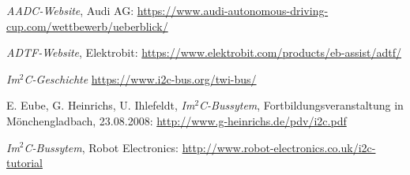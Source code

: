 \documentclass[12pt, a4paper]{scrartcl}
\begin{document}

\newpage
{}
\listoffigures

\newpage
{}
\begin{thebibliography}{9}
	\textit{AADC-Website},
	Audi AG:
	\url{https://www.audi-autonomous-driving-cup.com/wettbewerb/ueberblick/}
	
	\textit{ADTF-Website},
	Elektrobit:
	\url{https://www.elektrobit.com/products/eb-assist/adtf/}
	
	\textit{Im$^2$C-Geschichte}
	\url{https://www.i2c-bus.org/twi-bus/}
	
	E. Eube, G. Heinrichs, U. Ihlefeldt,
	\textit{Im$^2$C-Bussytem},
	Fortbildungsveranstaltung in Mönchengladbach, 23.08.2008:
	\url{http://www.g-heinrichs.de/pdv/i2c.pdf}
	
	\textit{Im$^2$C-Bussytem},
	Robot Electronics:
	\url{http://www.robot-electronics.co.uk/i2c-tutorial}

\end{thebibliography}

\end{document}
